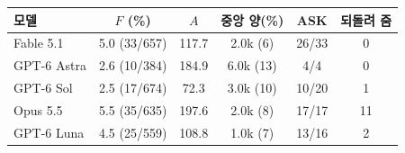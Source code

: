 \setlength{\tabcolsep}{2.4pt}
\small
\begin{tabular}{@{}lccccc@{}}
\toprule
모델 & $F$ (\%) & $A$ & 중앙 양(\%) & ASK & 되돌려 줌 \\
\midrule
Fable 5.1 & 5.0 (33/657) & 117.7 & 2.0k (6) & 26/33 & 0 \\
GPT-6 Astra & 2.6 (10/384) & 184.9 & 6.0k (13) & 4/4 & 0 \\
GPT-6 Sol & 2.5 (17/674) & 72.3 & 3.0k (10) & 10/20 & 1 \\
Opus 5.5 & 5.5 (35/635) & 197.6 & 2.0k (8) & 17/17 & 11 \\
GPT-6 Luna & 4.5 (25/559) & 108.8 & 1.0k (7) & 13/16 & 2 \\
\bottomrule
\end{tabular}
